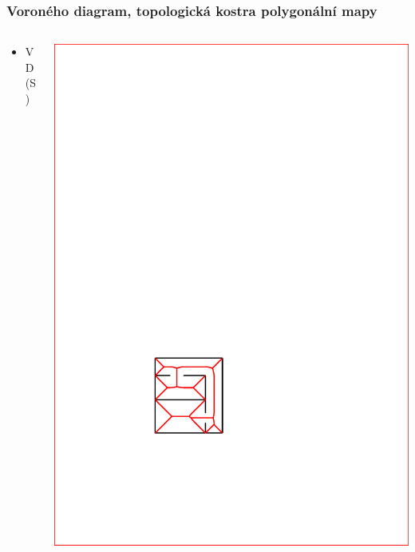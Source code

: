 \documentclass[notes=false,pdftex]{beamer}
\begin{document}
\begin{frame}
	\frametitle{Voroného diagram, topologická kostra polygonální mapy}

	\begin{columns}[T]
		\begin{column}{0.5\textwidth}
			\begin{itemize}
				\item VD(S)
			\end{itemize}
		\end{column}
		\begin{column}{0.5\textwidth}
			\includegraphics[width=1\textwidth,clip=true,trim=147pt 165pt 289pt 502pt]{images/vd_04.pdf} 
		\end{column}
	\end{columns}
\end{frame}

\end{document}
